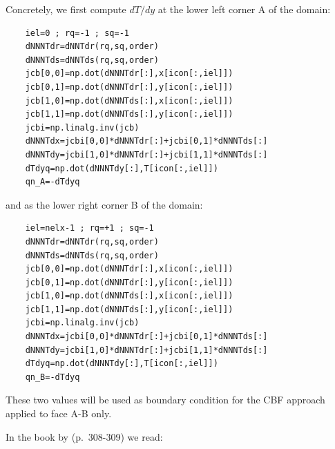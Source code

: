 Concretely, we first compute $dT/dy$ at the lower left corner A of the domain:
\begin{lstlisting}
    iel=0 ; rq=-1 ; sq=-1
    dNNNTdr=dNNTdr(rq,sq,order)
    dNNNTds=dNNTds(rq,sq,order)
    jcb[0,0]=np.dot(dNNNTdr[:],x[icon[:,iel]])
    jcb[0,1]=np.dot(dNNNTdr[:],y[icon[:,iel]])
    jcb[1,0]=np.dot(dNNNTds[:],x[icon[:,iel]])
    jcb[1,1]=np.dot(dNNNTds[:],y[icon[:,iel]])
    jcbi=np.linalg.inv(jcb)
    dNNNTdx=jcbi[0,0]*dNNNTdr[:]+jcbi[0,1]*dNNNTds[:]
    dNNNTdy=jcbi[1,0]*dNNNTdr[:]+jcbi[1,1]*dNNNTds[:]
    dTdyq=np.dot(dNNNTdy[:],T[icon[:,iel]])
    qn_A=-dTdyq
\end{lstlisting}
and as the lower right corner B of the domain:
\begin{lstlisting}
    iel=nelx-1 ; rq=+1 ; sq=-1
    dNNNTdr=dNNTdr(rq,sq,order)
    dNNNTds=dNNTds(rq,sq,order)
    jcb[0,0]=np.dot(dNNNTdr[:],x[icon[:,iel]])
    jcb[0,1]=np.dot(dNNNTdr[:],y[icon[:,iel]])
    jcb[1,0]=np.dot(dNNNTds[:],x[icon[:,iel]])
    jcb[1,1]=np.dot(dNNNTds[:],y[icon[:,iel]])
    jcbi=np.linalg.inv(jcb)
    dNNNTdx=jcbi[0,0]*dNNNTdr[:]+jcbi[0,1]*dNNNTds[:]
    dNNNTdy=jcbi[1,0]*dNNNTdr[:]+jcbi[1,1]*dNNNTds[:]
    dTdyq=np.dot(dNNNTdy[:],T[icon[:,iel]])
    qn_B=-dTdyq
\end{lstlisting}
These two values will be used as boundary condition for the CBF
approach applied to face A-B only.




\newpage


In the book by \textcite{reddybook2} (p.~308-309) we read:

